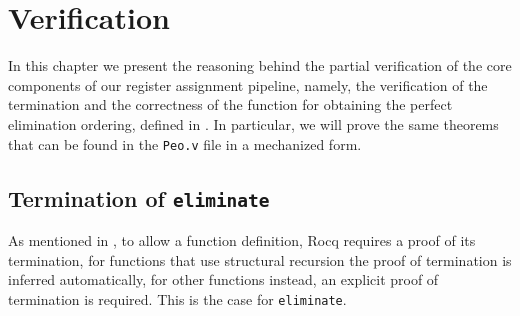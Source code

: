 
\chapter{Verification}
\label{cha:verification}

In this chapter we present the reasoning behind the partial verification of the core components of our register assignment pipeline, namely, the verification of the termination and the correctness of the function for obtaining the perfect elimination ordering, defined in . In particular, we will prove the same theorems that can be found in the \texttt{Peo.v} file in a mechanized form.

\section{Termination of \texttt{eliminate}}

As mentioned in , to allow a function definition, Rocq requires a proof of its termination, for functions that use structural recursion the proof of termination is inferred automatically, for other functions instead, an explicit proof of termination is required. This is the case for \texttt{eliminate}.

